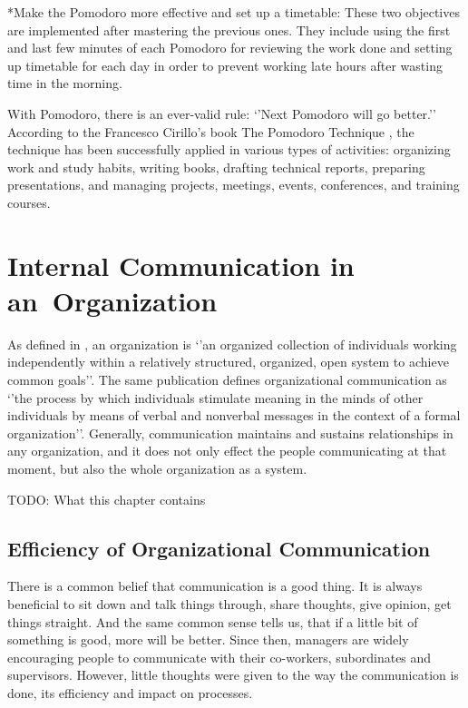 \documentclass[11pt,singleside]{myfithesis2}
\makeatletter
\renewcommand\paragraph{
   \vspace{-10pt}
   \@startsection{paragraph}{4}{0mm}
      {\baselineskip}
      {- 5pt}
      {\normalfont\normalsize\bfseries}
}
\makeatother
\begin{document}
\paragraph*{Make the Pomodoro more effective and set up a timetable: } These two objectives are implemented after mastering the previous ones. They include using the first and last few minutes of each Pomodoro for reviewing the work done and setting up timetable for each day in order to prevent working late hours after wasting time in the morning.

\vspace{\baselineskip}
With Pomodoro, there is an ever-valid rule: `'Next Pomodoro will go better.'' According to the Francesco Cirillo's book The Pomodoro Technique \cite{pomodoro}, the technique has been successfully applied in various types of activities: organizing work and study habits, writing books, drafting technical reports, preparing presentations, and managing projects, meetings, events, conferences, and training courses.


\chapter{Internal Communication in an~Organization}

As defined in \cite{orgCommForSurvival}, an organization is `'an organized collection of individuals working independently within a relatively structured, organized, open system to achieve common goals''. The same publication defines organizational communication as `'the process by which individuals stimulate meaning in the minds of other individuals by means of verbal and nonverbal messages in the context of a formal organization''. Generally, communication maintains and sustains relationships in any organization, and it does not only effect the people communicating at that moment, but also the whole organization as a system.

 TODO: What this chapter contains


	\section{Efficiency of Organizational Communication}\label{effOfOrgComm}
There is a common belief that communication is a good thing. It is always beneficial to sit down and talk things through, share thoughts, give opinion, get things straight. And the same common sense tells us, that if a little bit of something is good, more will be better. Since then, managers are widely encouraging people to communicate with their co-workers, subordinates and supervisors. However, little thoughts were given to the way the communication is done, its efficiency and impact on processes. 
\end{document}
